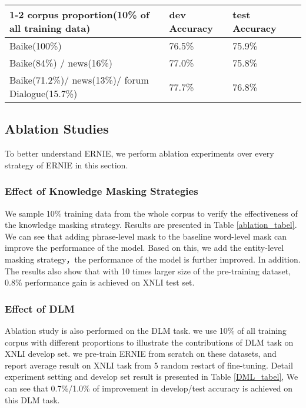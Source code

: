 \documentclass[11pt,a4paper]{article}
\begin{document}
\begin{table*}[!htbp]
  \caption{XNLI finetuning performance with DLM}
  \label{DML_tabel}
  \centering\textbf{}
  
  \begin{tabular}{llll}
    \toprule
    \cmidrule(r){1-2}
    corpus proportion(10\% of all training data)  & dev Accuracy& test Accuracy \\
    \midrule
    Baike(100\%) & 76.5\% &75.9\% \\
    Baike(84\%) /  news(16\%) & 77.0\% & 75.8\% \\
    Baike(71.2\%)/  news(13\%)/ forum Dialogue(15.7\%) & 77.7\%& 76.8\% \\
    \bottomrule
  \end{tabular}
\end{table*}



\subsection{Ablation Studies}
To better understand ERNIE, we perform ablation experiments over every strategy of ERNIE in this section.

\subsubsection{Effect of Knowledge Masking Strategies}
We sample 10\% training data from the whole corpus to verify the effectiveness of the knowledge masking strategy. 
Results are presented in Table \ref{ablation_tabel}. We can see that 
adding phrase-level mask to the baseline word-level mask can improve the performance of the model. Based on this, we add the entity-level masking strategy，the performance of the model is further improved. 
In addition. The results also show that with 10 times larger size of the pre-training dataset, 0.8\% performance gain is achieved on XNLI test set.


\subsubsection{Effect of DLM}
Ablation study is also performed on the DLM task. 
we use 10\% of all training corpus with different proportions to illustrate the contributions of DLM task on XNLI develop set.
we pre-train ERNIE from scratch on these datasets, and report average result on XNLI task from 5 random restart of fine-tuning.
Detail experiment setting and develop set result is presented in Table \ref{DML_tabel}, We can see that 0.7\%/1.0\% of improvement in develop/test accuracy is achieved on this DLM task.
\end{document}
